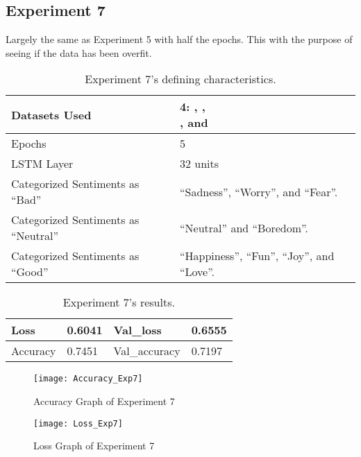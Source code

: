 \subsection{Experiment 7}
Largely the same as Experiment 5 with half the epochs. This with the purpose of seeing if the data has been overfit.
\begin{table}[!h]
	\caption{Experiment 7's defining characteristics.}
	\vspace{0.5cm}
	\centering
	\begin{tabular}[t]{|l|l|}
	\hline
		Datasets Used & \makecell{4: \citet{d1}, \citet{d2},\\ \citet{d3}, and \citet{d4}}
	\\ \hline
		Epochs & 5
	\\ \hline
		LSTM Layer & 32 units
	\\ \hline
		Categorized Sentiments as ``Bad'' & ``Sadness'', ``Worry'', and ``Fear''.
	\\ \hline	
		 Categorized Sentiments as ``Neutral'' & ``Neutral'' and ``Boredom''.
	\\ \hline	
		Categorized Sentiments as ``Good'' & ``Happiness'', ``Fun'', ``Joy'', and ``Love''.
	\\ \hline
	\end{tabular}
\end{table}

\begin{table}[!b]
	\caption{Experiment 7's results.}
	\vspace{0.5cm}
	\centering
	\begin{tabular}[t]{|l|l|l|l|}
	\hline
		Loss & 0.6041 & Val\_loss & 0.6555
	\\ \hline
		Accuracy & 0.7451 & Val\_accuracy & 0.7197
	\\ \hline
	\end{tabular}
\end{table}


\begin{figure}[!h]
	\centering
	\texttt{[image: Accuracy\_Exp7]}
	\caption{Accuracy Graph of Experiment 7}
	\label{fig:accuracy_exp7}
	\texttt{[image: Loss\_Exp7]}
	\caption{Loss Graph of Experiment 7}
	\label{fig:loss_exp7}
\end{figure}
\pagebreak